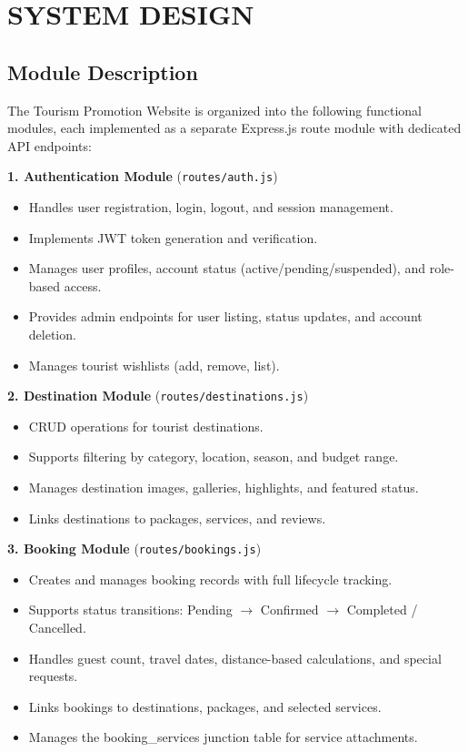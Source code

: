 \chapter{SYSTEM DESIGN}

\section{Module Description}

The Tourism Promotion Website is organized into the following functional modules, each implemented as a separate Express.js route module with dedicated API endpoints:

\textbf{1. Authentication Module} (\texttt{routes/auth.js})
\begin{itemize}[leftmargin=2em]
    \item Handles user registration, login, logout, and session management.
    \item Implements JWT token generation and verification.
    \item Manages user profiles, account status (active/pending/suspended), and role-based access.
    \item Provides admin endpoints for user listing, status updates, and account deletion.
    \item Manages tourist wishlists (add, remove, list).
\end{itemize}

\textbf{2. Destination Module} (\texttt{routes/destinations.js})
\begin{itemize}[leftmargin=2em]
    \item CRUD operations for tourist destinations.
    \item Supports filtering by category, location, season, and budget range.
    \item Manages destination images, galleries, highlights, and featured status.
    \item Links destinations to packages, services, and reviews.
\end{itemize}

\textbf{3. Booking Module} (\texttt{routes/bookings.js})
\begin{itemize}[leftmargin=2em]
    \item Creates and manages booking records with full lifecycle tracking.
    \item Supports status transitions: Pending $\rightarrow$ Confirmed $\rightarrow$ Completed / Cancelled.
    \item Handles guest count, travel dates, distance-based calculations, and special requests.
    \item Links bookings to destinations, packages, and selected services.
    \item Manages the booking\_services junction table for service attachments.
\end{itemize}

